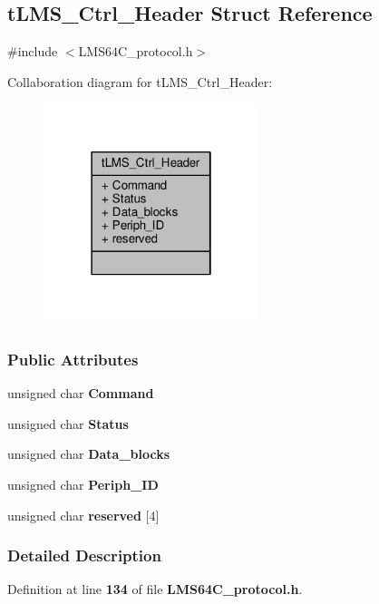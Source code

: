 \subsection{t\+L\+M\+S\+\_\+\+Ctrl\+\_\+\+Header Struct Reference}
\label{structtLMS__Ctrl__Header}


{\ttfamily \#include $<$L\+M\+S64\+C\+\_\+protocol.\+h$>$}



Collaboration diagram for t\+L\+M\+S\+\_\+\+Ctrl\+\_\+\+Header\+:\nopagebreak
\begin{figure}[H]
\begin{center}
\leavevmode
\includegraphics[width=178pt]{dc/d8f/structtLMS__Ctrl__Header__coll__graph}
\end{center}
\end{figure}
\subsubsection*{Public Attributes}
\begin{DoxyCompactItemize}
\item 
unsigned char {\bf Command}
\item 
unsigned char {\bf Status}
\item 
unsigned char {\bf Data\+\_\+blocks}
\item 
unsigned char {\bf Periph\+\_\+\+ID}
\item 
unsigned char {\bf reserved} [4]
\end{DoxyCompactItemize}


\subsubsection{Detailed Description}


Definition at line {\bf 134} of file {\bf L\+M\+S64\+C\+\_\+protocol.\+h}.



